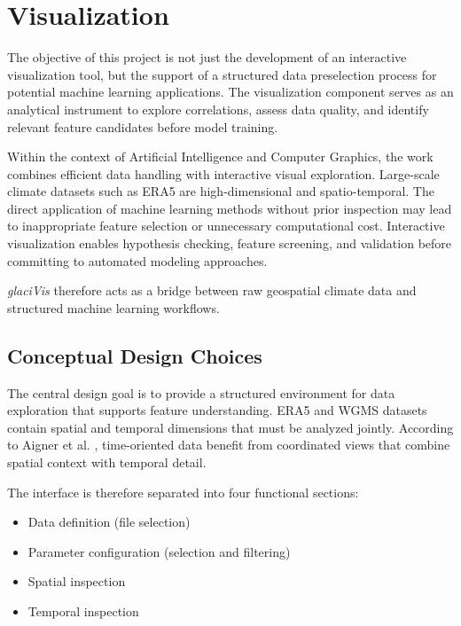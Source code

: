 \chapter{Visualization}

The objective of this project is not just the development of an interactive visualization tool, but the support of a structured data preselection process for potential machine learning applications.
The visualization component serves as an analytical instrument to explore correlations, assess data quality, and identify relevant feature candidates before model training.

Within the context of Artificial Intelligence and Computer Graphics, the work combines efficient data handling with interactive visual exploration. Large-scale climate datasets such as ERA5 are high-dimensional and spatio-temporal.
The direct application of machine learning methods without prior inspection may lead to inappropriate feature selection or unnecessary computational cost. Interactive visualization enables hypothesis checking, feature screening, and validation before committing to automated modeling approaches.

\textit{glaciVis} therefore acts as a bridge between raw geospatial climate data and structured machine learning workflows.


\section{Conceptual Design Choices}
\label{sec:conceptual_design_choices}

The central design goal is to provide a structured environment for data exploration that supports feature understanding. ERA5 and WGMS datasets contain spatial and temporal dimensions that must be analyzed jointly. According to Aigner et al. \parencite[p.380]{aigner_time_oriented_data}, time-oriented data benefit from coordinated views that combine spatial context with temporal detail. 

The interface is therefore separated into four functional sections:

\begin{itemize}
    \item Data definition (file selection)
    \item Parameter configuration (selection and filtering)
    \item Spatial inspection
    \item Temporal inspection
\end{itemize}

